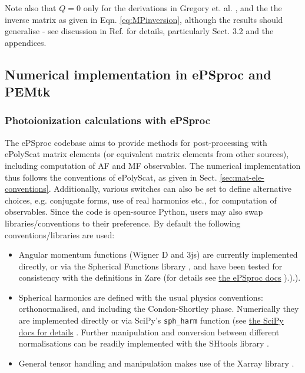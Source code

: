 \documentclass[10pt]{article}
\begin{document}
Note also that $Q=0$ only for the derivations in Gregory et. al. \cite{gregory2021MolecularFramePhotoelectron}, and the the inverse matrix as given in Eqn. \ref{eq:MPinversion}, although the results should generalise - see discussion in Ref. \cite{gregory2021MolecularFramePhotoelectron} for details, particularly Sect. 3.2 and the appendices.
\subsection{Numerical implementation in ePSproc and PEMtk\label{sec:numerical-notes}}

\subsubsection{Photoionization calculations with ePSproc}

The ePSproc codebase \cite{ePSprocAuthorea, ePSprocGithub, ePSprocDocs} aims to provide methods for post-processing with ePolyScat matrix elements (or equivalent matrix elements from other sources), including computation of AF and MF observables. The numerical implementation thus follows the conventions of ePolyScat, as given in Sect. \ref{sec:mat-ele-conventions}. Additionally, various switches can also be set to define alternative choices, e.g. conjugate forms, use of real harmonics etc., for computation of observables. Since the code is open-source Python, users may also swap libraries/conventions to their preference. By default the following conventions/libraries are used:

\begin{itemize}
\item Angular momentum functions (Wigner D and 3js) are currently implemented directly, or via the Spherical Functions library \cite{boyle2022SphericalFunctions}, and have been tested for consistency with the definitions in Zare (for details see \href{https://epsproc.readthedocs.io/en/latest/tests/Spherical_function_testing_Aug_2019.html}{the ePSproc docs} \cite{ePSprocDocs}).\cite{ePSprocDocs}).\cite{ePSprocDocs}).
\item Spherical harmonics are defined with the usual physics conventions: orthonormalised, and including the Condon-Shortley phase. Numerically they are implemented directly or via SciPy's \verb+sph_harm+ function (see \href{https://docs.scipy.org/doc/scipy/reference/generated/scipy.special.sph_harm.html}{the SciPy docs for details} \cite{SciPyDocumentation}. Further manipulation and conversion between different normalisations can be readily implemented with the SHtools library \cite{wieczorek2018SHToolsToolsWorking,SHtoolsGithub}.
\item General tensor handling and manipulation makes use of the Xarray library \cite{hoyer2017XarrayNDLabeled,XarrayDocumentation}.
\end{itemize}
\end{document}
